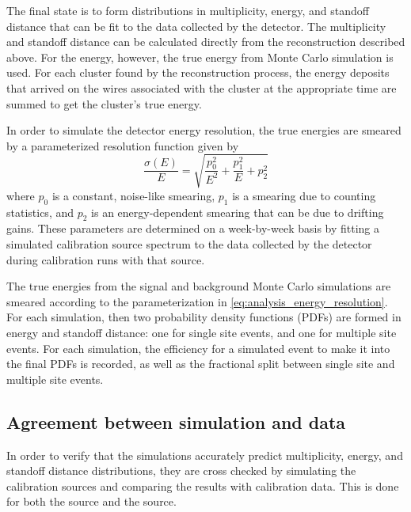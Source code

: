 \documentclass[herrin-thesis.tex]{subfiles}
\begin{document}
The final state is to form distributions in multiplicity, energy, and standoff distance that can be fit to the data collected by the detector. The multiplicity and standoff distance can be calculated directly from the reconstruction described above. For the energy, however, the true energy from Monte Carlo simulation is used. For each cluster found by the reconstruction process, the energy deposits that arrived on the wires associated with the cluster at the appropriate time are summed to get the cluster's true energy.

In order to simulate the detector energy resolution, the true energies are smeared by a parameterized resolution function given by
\begin{equation}
\frac{\sigma(E)}{E} = \sqrt{\frac{p_0^2}{E^2} + \frac{p_1^2}{E} + p_2^2}
\label{eq:analysis_energy_resolution}
\end{equation}
where \(p_0\) is a constant, noise-like smearing, \(p_1\) is a smearing due to counting statistics, and \(p_2\) is an energy-dependent smearing that can be due to drifting gains. These parameters are determined on a week-by-week basis by fitting a simulated calibration source spectrum to the data collected by the detector during calibration runs with that source.

The true energies from the signal and background Monte Carlo simulations are smeared according to the parameterization in \cref{eq:analysis_energy_resolution}. For each simulation, then two probability density functions (PDFs) are formed in energy and standoff distance: one for single site events, and one for multiple site events. For each simulation, the efficiency for a simulated event to make it into the final PDFs is recorded, as well as the fractional split between single site and multiple site events.

\subsection{Agreement between simulation and data}
In order to verify that the simulations accurately predict multiplicity, energy, and standoff distance distributions, they are cross checked by simulating the calibration sources and comparing the results with calibration data. This is done for both the  source and the  source.
\end{document}
